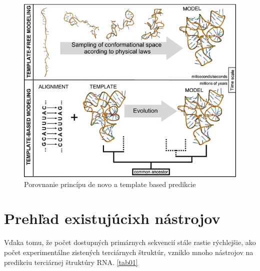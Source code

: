 \begin{figure}%
\includegraphics[width=\textwidth]{../img/template-vs-denovo}
\caption{Porovnanie princípu de novo a template based predikcie \cite{Rother11}}
\label{obr04:porovnanie}
\end{figure}


\section{Prehľad existujúcixh nástrojov}
Vďaka tomu, že počet dostupných primárnych sekvencií stále rastie rýchlejšie, ako počet experimentálne zistených terciárnych štruktúr, vzniklo mnoho nástrojov na predikciu terciárnej štruktúry RNA. \ref{tab01}


